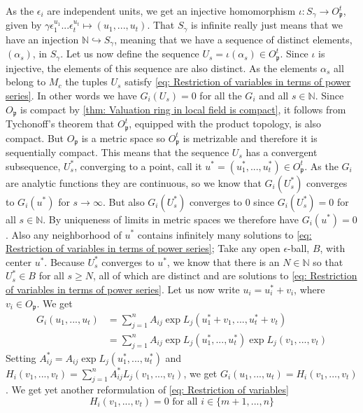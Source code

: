 \documentclass{article}
\newcommand{\mfrak}[1]{\mathfrak{#1}}
\newcommand{\mbb}[1]{\mathbb{#1}}
\numberwithin{equation}{section}
\begin{document}
As the $\epsilon_i$ are independent units, we get an injective homomorphism $\iota : S_\gamma \to O_\mfrak p^t$, given by $\gamma \epsilon_1^{u_1} ... \epsilon_t^{u_t} \mapsto (u_1, ..., u_t)$. That $S_\gamma$ is infinite really just means that we have an injection $\mbb N \hookrightarrow S_\gamma$, meaning that we have a sequence of distinct elements, $(\alpha_s)$, in $S_\gamma$. Let us now define the sequence $U_s = \iota(\alpha_s) \in O_\mfrak p^t$. Since $\iota$ is injective, the elements of this sequence are also distinct. As the elements $\alpha_s$ all belong to $M_c$ the tuples $U_s$ satisfy \cref{eq: Restriction of variables in terms of power series}. In other words we have $G_i(U_s) = 0$ for all the $G_i$ and all $s \in \mbb N$. Since $O_\mfrak p$ is compact by \cref{thm: Valuation ring in local field is compact}, it follows from Tychonoff's theorem that $O_\mfrak p^t$, equipped with the product topology, is also compact. But $O_\mfrak p$ is a metric space so $O_\mfrak p^t$ is metrizable and therefore it is sequentially compact. This means that the sequence $U_s$ has a convergent subsequence, $U^*_s$, converging to a point, call it $u^* = (u_1^*, ..., u_t^*) \in O_{\mfrak p}^t$. As the $G_i$ are analytic functions they are continuous, so we know that $G_i(U^*_s)$ converges to $G_i(u^*)$ for $s \to \infty$. But also $G_i(U^*_s)$ converges to 0 since $G_i(U^*_s) = 0$ for all $s \in \mbb N$. By uniqueness of limits in metric spaces we therefore have $G_i(u^*) = 0$. Also any neighborhood of $u^*$ contains infinitely many solutions to \cref{eq: Restriction of variables in terms of power series}; Take any open $\epsilon$-ball, $B$, with center $u^*$. Because $U^*_s$ converges to $u^*$, we know that there is an $N \in \mbb N$ so that $U^*_s \in B$ for all $s \geq N$, all of which are distinct and are solutions to \cref{eq: Restriction of variables in terms of power series}. Let us now write $u_i = u_i^* + v_i$, where $v_i \in O_\mfrak p$. We get
\begin{align*}
	G_i(u_1, ..., u_t) & = \sum_{j = 1}^n A_{ij} \exp L_j(u_1^* + v_1, ..., u_t^* + v_t)         	\\
                   	& = \sum_{j = 1}^n A_{ij} \exp L_j(u_1^*, ..., u_t^*) \exp L_j(v_1, ..., v_t)
\end{align*}
Setting $A_{ij}^* = A_{ij} \exp L_j(u_1^*, ..., u_t^*)$ and $H_i(v_1, ..., v_t) = \sum_{j = 1}^n A_{ij}^* L_j(v_1, ..., v_t)$, we get
$G_i(u_1, ..., u_t) = H_i(v_1, ..., v_t)$. We get yet another reformulation of \cref{eq: Restriction of variables}
\begin{equation}\label{eq: Equations inducing a manifold}
	H_i(v_1, ..., v_t) = 0 \text{ for all } i \in \{m+1, ..., n\}
\end{equation}
\end{document}
